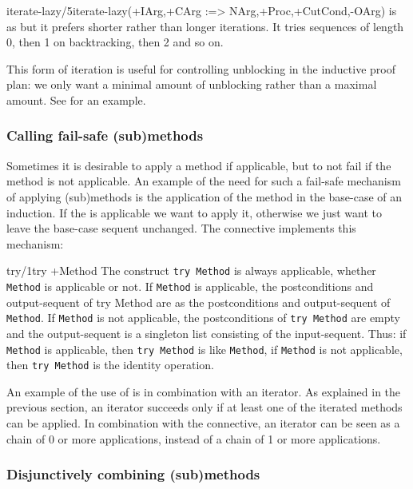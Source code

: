 \begin{predicate}{iterate-lazy/5}{iterate-lazy(+IArg,+CArg :=> NArg,+Proc,+CutCond,-OArg)}%
 is as  but it prefers shorter rather
than longer iterations.  It tries sequences of length 0, then 1 on
backtracking, then 2 and so on.

This form of iteration is useful for controlling unblocking  in the
inductive proof plan: we only want a minimal amount of unblocking
rather than a maximal amount.  See  for an example.
\end{predicate}

\subsubsection {Calling fail-safe (sub)methods}
 Sometimes it is desirable to apply a method if applicable, but to not
fail if the method is not applicable. An example of the need for such a
fail-safe mechanism of applying (sub)methods is the application of the
 method in the base-case of an induction. If the 
is applicable we want to apply it, otherwise we just want to leave the
base-case sequent unchanged. The  connective implements this
mechanism:

\begin{predicate}{try/1}{try +Method}%
The construct {\tt try Method} is always applicable, whether
{\tt Method} is applicable or not. If {\tt Method} is
applicable, the postconditions and output-sequent of {try Method} are
as the postconditions and output-sequent of {\tt Method}. If
{\tt Method} is not applicable, the postconditions of {\tt try Method}
are empty and the output-sequent is a singleton list consisting of the
input-sequent. Thus: if {\tt Method} is applicable, then
{\tt try Method} is like {\tt Method}, if {\tt Method} is not
applicable, then {\tt try Method} is the identity operation.

An example of the use of  is in combination with an iterator.
As explained in the previous section, an iterator succeeds only if at
least one of the iterated methods can be applied. In combination with
the  connective, an iterator can be seen as a chain of 0 or
more applications, instead of a chain of 1 or more applications.
\end{predicate}

\subsubsection {Disjunctively combining (sub)methods}

